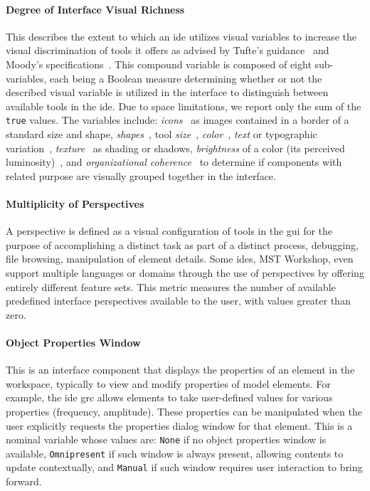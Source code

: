 \paragraph{Degree of Interface Visual Richness}
This describes the extent to which an \ac{ide} utilizes visual variables to
increase the visual discrimination of tools it offers as advised by Tufte's
guidance~\cite{Tufte2001} and Moody's specifications~\cite{moody2009}.
This compound variable is composed of eight sub-variables, each being a
Boolean measure determining whether or not the described visual variable is
utilized in the interface to distinguish between available tools in the
\ac{ide}. Due to space limitations, we report only the sum of the
\texttt{true} values. The variables include:
\emph{icons}~\cite{costagliola2002,moody2009} as images contained in a
border of a standard size and shape, \emph{shapes}~\cite{moody2009}, tool
\emph{size}~\cite{moody2009}, \emph{color}~\cite{moody2009}, \emph{text} or
typographic variation~\cite{moody2009}, \emph{texture}~\cite{moody2009} as
shading or shadows, \emph{brightness} of a color (\ie its perceived
luminosity)~\cite{moody2009}, and \emph{organizational
coherence}~\cite{constantine1996} to determine if components with related
purpose are visually grouped together in the interface.


\paragraph{Multiplicity of Perspectives}
A perspective is defined as a visual configuration of tools in the \ac{gui}
for the purpose of accomplishing a distinct task as part of a distinct
process, \eg debugging, file browsing, manipulation of element details.
Some \acp{ide}, \eg MST Workshop, even support multiple languages or
domains through the use of perspectives by offering entirely different
feature sets. This metric measures the number of available predefined
interface perspectives available to the user, with values greater than
zero.


\paragraph{Object Properties Window}
This is an interface component that displays the properties of an element
in the workspace, typically to view and modify properties of model
elements. For example, the \ac{ide} \ac{grc} allows elements to take
user-defined values for various properties (\eg frequency, amplitude).
These properties can be manipulated when the user explicitly requests the
properties dialog window for that element. This is a nominal variable
whose values are: \texttt{None} if no object properties window is
available, \texttt{Omnipresent} if such window is always present, allowing
contents to update contextually, and \texttt{Manual} if such window
requires user interaction to bring forward.


